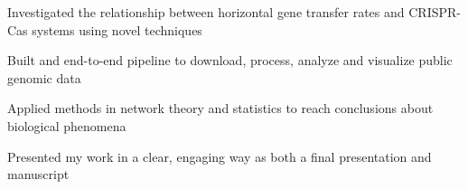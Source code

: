 \begin{cventries}
      {
        \begin{cvitems}
         \item {Investigated the relationship between horizontal gene transfer rates and CRISPR-Cas systems using novel techniques}
         \item {Built and end-to-end pipeline to download, process, analyze and visualize public genomic data}
         \item {Applied methods in network theory and statistics to reach conclusions about biological phenomena}
         \item {Presented my work in a clear, engaging way as both a final presentation and manuscript}
        \end{cvitems}
      }
\end{cventries}
